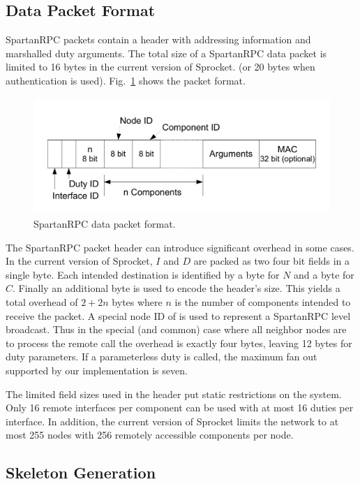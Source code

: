 \subsection{Data Packet Format}
\label{section-packet-format}

SpartanRPC packets contain a header with addressing information and marshalled duty arguments.
The total size of a SpartanRPC data packet is limited to 16 bytes in the current version of
Sprocket. (or 20 bytes when authentication is used). Fig.~\ref{fig:packet} shows the packet
format.

\begin{figure}[!t]
  \centering
  \includegraphics[scale=0.43]{packet}
  \caption{SpartanRPC data packet format.}
  \label{fig:packet}
\end{figure}

The SpartanRPC packet header can introduce significant overhead in some cases. In the current
version of Sprocket, $I$ and $D$ are packed as two four bit fields in a single byte. Each
intended destination is identified by a byte for $N$ and a byte for $C$. Finally an additional
byte is used to encode the header's size. This yields a total overhead of $2 + 2n$ bytes where
$n$ is the number of components intended to receive the packet. A special node ID of 
is used to represent a SpartanRPC level broadcast. Thus in the special (and common) case where
all neighbor nodes are to process the remote call the overhead is exactly four bytes, leaving 12
bytes for duty parameters. If a parameterless duty is called, the maximum fan out supported by
our implementation is seven.

The limited field sizes used in the header put static restrictions on the system. Only 16 remote
interfaces per component can be used with at most 16 duties per interface. In addition, the
current version of Sprocket limits the network to at most 255 nodes with 256 remotely accessible
components per node.

\subsection{Skeleton Generation}

